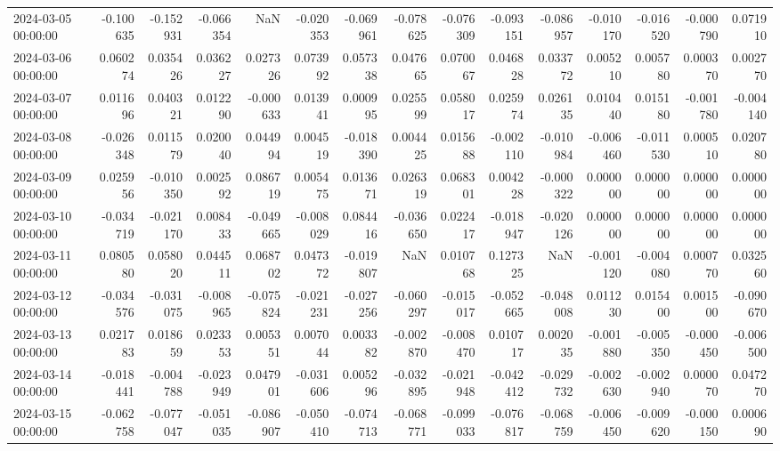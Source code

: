 \begin{tabular}{lrrrrrrrrrrrrrr}
2024-03-05 00:00:00 & -0.100635 & -0.152931 & -0.066354 & NaN & -0.020353 & -0.069961 & -0.078625 & -0.076309 & -0.093151 & -0.086957 & -0.010170 & -0.016520 & -0.000790 & 0.071910 \\
2024-03-06 00:00:00 & 0.060274 & 0.035426 & 0.036227 & 0.027326 & 0.073992 & 0.057338 & 0.047665 & 0.070067 & 0.046828 & 0.033772 & 0.005210 & 0.005780 & 0.000370 & 0.002770 \\
2024-03-07 00:00:00 & 0.011696 & 0.040321 & 0.012290 & -0.000633 & 0.013941 & 0.000995 & 0.025599 & 0.058017 & 0.025974 & 0.026135 & 0.010440 & 0.015180 & -0.001780 & -0.004140 \\
2024-03-08 00:00:00 & -0.026348 & 0.011579 & 0.020040 & 0.044994 & 0.004519 & -0.018390 & 0.004425 & 0.015688 & -0.002110 & -0.010984 & -0.006460 & -0.011530 & 0.000510 & 0.020780 \\
2024-03-09 00:00:00 & 0.025956 & -0.010350 & 0.002592 & 0.086719 & 0.005475 & 0.013671 & 0.026319 & 0.068301 & 0.004228 & -0.000322 & 0.000000 & 0.000000 & 0.000000 & 0.000000 \\
2024-03-10 00:00:00 & -0.034719 & -0.021170 & 0.008433 & -0.049665 & -0.008029 & 0.084416 & -0.036650 & 0.022417 & -0.018947 & -0.020126 & 0.000000 & 0.000000 & 0.000000 & 0.000000 \\
2024-03-11 00:00:00 & 0.080580 & 0.058020 & 0.044511 & 0.068702 & 0.047372 & -0.019807 & NaN & 0.010768 & 0.127325 & NaN & -0.001120 & -0.004080 & 0.000770 & 0.032560 \\
2024-03-12 00:00:00 & -0.034576 & -0.031075 & -0.008965 & -0.075824 & -0.021231 & -0.027256 & -0.060297 & -0.015017 & -0.052665 & -0.048008 & 0.011230 & 0.015400 & 0.001500 & -0.090670 \\
2024-03-13 00:00:00 & 0.021783 & 0.018659 & 0.023353 & 0.005351 & 0.007044 & 0.003382 & -0.002870 & -0.008470 & 0.010717 & 0.002035 & -0.001880 & -0.005350 & -0.000450 & -0.006500 \\
2024-03-14 00:00:00 & -0.018441 & -0.004788 & -0.023949 & 0.047901 & -0.031606 & 0.005296 & -0.032895 & -0.021948 & -0.042412 & -0.029732 & -0.002630 & -0.002940 & 0.000070 & 0.047270 \\
2024-03-15 00:00:00 & -0.062758 & -0.077047 & -0.051035 & -0.086907 & -0.050410 & -0.074713 & -0.068771 & -0.099033 & -0.076817 & -0.068759 & -0.006450 & -0.009620 & -0.000150 & 0.000690 \\
\bottomrule
\end{tabular}
